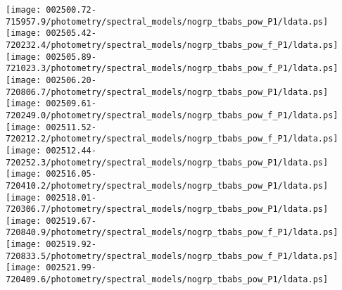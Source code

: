 \documentclass{aastex}
\begin{document}
\begin{figure*}[!ht]
\centering
\texttt{[image: 002500.72-715957.9/photometry/spectral\_models/nogrp\_tbabs\_pow\_P1/ldata.ps]} \hfill 
\texttt{[image: 002505.42-720232.4/photometry/spectral\_models/nogrp\_tbabs\_pow\_f\_P1/ldata.ps]} \hfill 
\texttt{[image: 002505.89-721023.3/photometry/spectral\_models/nogrp\_tbabs\_pow\_f\_P1/ldata.ps]} \\ 
\vspace*{0.5in}
\texttt{[image: 002506.20-720806.7/photometry/spectral\_models/nogrp\_tbabs\_pow\_P1/ldata.ps]} \hfill 
\texttt{[image: 002509.61-720249.0/photometry/spectral\_models/nogrp\_tbabs\_pow\_f\_P1/ldata.ps]} \hfill 
\texttt{[image: 002511.52-720212.2/photometry/spectral\_models/nogrp\_tbabs\_pow\_f\_P1/ldata.ps]} \\ 
\vspace*{0.5in}
\texttt{[image: 002512.44-720252.3/photometry/spectral\_models/nogrp\_tbabs\_pow\_P1/ldata.ps]} \hfill 
\texttt{[image: 002516.05-720410.2/photometry/spectral\_models/nogrp\_tbabs\_pow\_P1/ldata.ps]} \hfill 
\texttt{[image: 002518.01-720306.7/photometry/spectral\_models/nogrp\_tbabs\_pow\_P1/ldata.ps]} \\ 
\vspace*{0.5in}
\texttt{[image: 002519.67-720840.9/photometry/spectral\_models/nogrp\_tbabs\_pow\_f\_P1/ldata.ps]} \hfill 
\texttt{[image: 002519.92-720833.5/photometry/spectral\_models/nogrp\_tbabs\_pow\_f\_P1/ldata.ps]} \hfill 
\texttt{[image: 002521.99-720409.6/photometry/spectral\_models/nogrp\_tbabs\_pow\_P1/ldata.ps]} \\ 
\vspace*{0.5in}
\end{figure*}
\clearpage
\end{document}
